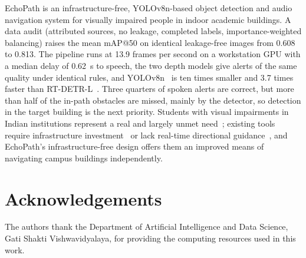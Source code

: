 \documentclass[3p,times,procedia]{elsarticle}
\begin{document}
EchoPath is an infrastructure-free, YOLOv8n-based object detection and audio
navigation system for visually impaired people in indoor academic buildings.
A data audit (attributed sources, no leakage, completed labels,
importance-weighted balancing) raises the mean mAP@50 on identical
leakage-free images from 0.608 to 0.813. The pipeline runs at 13.9 frames
per second on a workstation GPU with a median delay of 0.62~s to speech, the
two depth models give alerts of the same quality under identical rules, and
YOLOv8n~\cite{jocher2023yolov8} is ten times smaller and 3.7 times faster
than RT-DETR-L~\cite{zhao2023rtdetr}. Three quarters of spoken alerts are
correct, but more than half of the in-path obstacles are missed, mainly by
the detector, so detection in the target building is the next priority. Students with visual impairments in Indian institutions represent a
real and largely unmet need~\cite{at2030}; existing tools require
infrastructure investment~\cite{ahmetovic2016navcog} or lack real-time
directional guidance~\cite{messaoudi2022}, and EchoPath's
infrastructure-free design offers them an improved means of navigating
campus buildings independently.

\section*{Acknowledgements}

The authors thank the Department of Artificial Intelligence and Data Science,
Gati Shakti Vishwavidyalaya, for providing the computing resources used in this
work.
\end{document}
